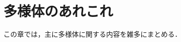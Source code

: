 \documentclass[geometry_main]{subfiles}
\begin{document}
\setcounter{chapter}{1}

\chapter{多様体のあれこれ}
\label{appendixB}
この章では，主に多様体に関する内容を雑多にまとめる．




\end{document}
